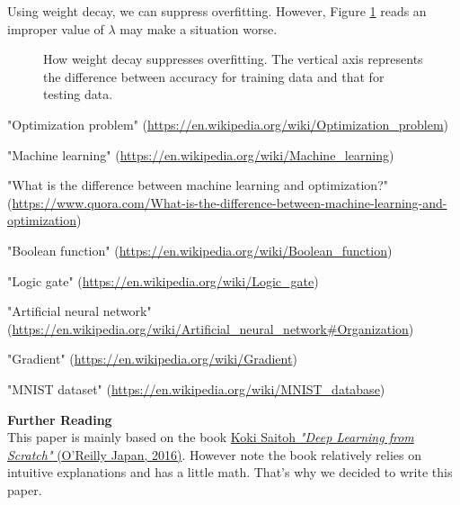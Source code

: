 \documentclass{article}
\theoremstyle{definition}
\newcommand{\fig}[1]{Figure \ref{fig:#1}}
\begin{document}
\begin{appendices}
Using weight decay, we can suppress overfitting. However, \fig{A.4} reads an improper value of $\lambda$ may make a situation worse.

\begin{figure}[H]
    \centering
    \begin{subfigure}[H]{1.0\textwidth}
	\end{subfigure}
    \caption{How weight decay suppresses overfitting. The vertical axis represents the difference between accuracy for training data and that for testing data.}
    \label{fig:A.4}
\end{figure}


\end{appendices}


\newpage

\begin{thebibliography}{100}

"Optimization problem" (\url{https://en.wikipedia.org/wiki/Optimization_problem})

"Machine learning" (\url{https://en.wikipedia.org/wiki/Machine_learning})

"What is the difference between machine learning and optimization?" (\url{https://www.quora.com/What-is-the-difference-between-machine-learning-and-optimization})

"Boolean function" (\url{https://en.wikipedia.org/wiki/Boolean_function})

"Logic gate" (\url{https://en.wikipedia.org/wiki/Logic_gate})

"Artificial neural network" (\url{https://en.wikipedia.org/wiki/Artificial_neural_network#Organization})

"Gradient" (\url{https://en.wikipedia.org/wiki/Gradient})

"MNIST dataset" (\url{https://en.wikipedia.org/wiki/MNIST_database})

\end{thebibliography}

\enter
{\bf Further Reading}\\
This paper is mainly based on the book \href{https://www.oreilly.co.jp/books/9784873117584/}{Koki Saitoh {\it "Deep Learning from Scratch"} (O'Reilly Japan, 2016)}. However note the book relatively relies on intuitive explanations and has a little math. That's why we decided to write this paper.
\end{document}
